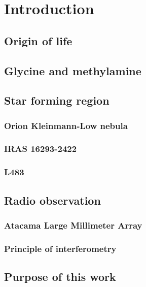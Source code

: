 \chapter{Introduction
  \label{chap:introduction}}


\section{Origin of life}

\section{Glycine and methylamine}

\section{Star forming region}
\subsection{Orion Kleinmann-Low nebula}
\subsection{IRAS 16293-2422}
\subsection{L483}

\section{Radio observation}
\subsection{Atacama Large Millimeter Array}
\subsection{Principle of interferometry}

\section{Purpose of this work}
